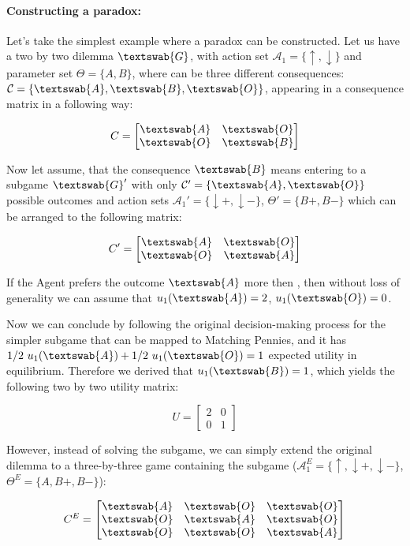 \documentclass{article}
\begin{document}
\paragraph{Constructing a paradox:}

Let's take the simplest example where a paradox can be constructed.
Let us have a two by two dilemma $\textswab{G}$, with action set $\mathcal{A}_1 = \{\uparrow,\downarrow\}$ and parameter set $\Theta=\{A,B\}$, where can be three different consequences: $\mathcal{C}=\{\textswab{A},\textswab{B},\textswab{O}\}$, appearing in a consequence matrix in a following way:

\[
C=
\begin{bmatrix}
\textswab{A} & \textswab{O} \\
\textswab{O} & \textswab{B}
\end{bmatrix}
\]

Now let assume, that the consequence $\textswab{B}$ means entering to a subgame $\textswab{G}'$ with only $\mathcal{C}'=\{\textswab{A},\textswab{O}\}$ possible outcomes and action sets $\mathcal{A}_1'=\{\downarrow+,\downarrow-\}$, $\Theta'=\{B+,B-\}$ which can be arranged to the following matrix:

\[
C'=
\begin{bmatrix}
\textswab{A} & \textswab{O} \\
\textswab{O} & \textswab{A}
\end{bmatrix}
\]

If the Agent prefers the outcome $\textswab{A}$ more then , then without loss of generality we can assume that $u_1(\textswab{A})=2$, $u_1(\textswab{O})=0$.

Now we can conclude by following the original decision-making process for the simpler subgame that can be mapped to Matching Pennies, and it has $1/2 \ u_1(\textswab{A}) + 1/2 \ u_1(\textswab{O}) = 1$ expected utility in equilibrium. Therefore we derived that $u_1(\textswab{B}) = 1$, which yields the following two by two utility matrix:

\[
U=
\begin{bmatrix}
2 & 0 \\
0 & 1
\end{bmatrix}
\]

However, instead of solving the subgame, we can simply extend the original dilemma to a three-by-three game containing the subgame ($\mathcal{A}^E_1=\{\uparrow,\downarrow+,\downarrow-\}$, $\Theta^E=\{A,B+,B-\}$):

\[
C^E=
\begin{bmatrix}
\textswab{A} & \textswab{O} & \textswab{O} \\
\textswab{O} & \textswab{A} & \textswab{O} \\
\textswab{O} & \textswab{O} & \textswab{A}
\end{bmatrix}
\]
\end{document}
